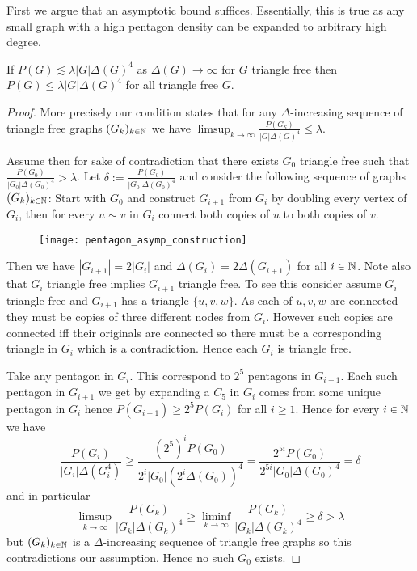 First we argue that an asymptotic bound suffices. Essentially, this is true as any small
graph with a high pentagon density can be expanded to arbitrary high degree.
\begin{lemma}
    \label{lemma:pentagon_asymp_suffices}
    If $P(G) \lesssim \lambda|G|\Delta(G)^4$ as $\Delta(G)\to\infty$ for
    $G$ triangle free
    then $P(G) \leq \lambda|G|\Delta(G)^4$ for all triangle free $G$.
\end{lemma}

\begin{proof}
    More precisely our condition states that for any $\Delta$-increasing sequence of
    triangle free graphs $(G_k)_{k\in\mathbb{N}}$ we have
    $\limsup_{k\to\infty} \frac{P(G_k)}{|G|\Delta(G)^4} \leq \lambda$.

    Assume then for sake of contradiction that there exists $G_0$ triangle free
    such that $\frac{P(G_0)}{|G_0|\Delta(G_0)^4} > \lambda$.
    Let $\delta := \frac{P(G_0)}{|G_0|\Delta(G_0)^4}$ and consider the following
    sequence of graphs $(G_k)_{k\in\mathbb{N}}$: Start with $G_0$ and construct
    $G_{i+1}$ from $G_i$ by doubling every vertex of $G_i$, then for every
    $u\sim v$ in $G_i$ connect both copies of $u$ to both copies of $v$.

    \begin{figure}[!ht]
        \centering
        \texttt{[image: pentagon\_asymp\_construction]}
    \end{figure}

    Then we have $|G_{i+1}| = 2|G_i|$ and $\Delta(G_i) = 2\Delta(G_{i+1})$ for all
    $i\in\mathbb{N}$. Note also that $G_i$ triangle free implies $G_{i+1}$ triangle free.
    To see this consider assume $G_i$ triangle free and $G_{i+1}$ has a triangle
    $\{u, v, w\}$. As each of $u,v,w$ are connected they must be copies of three
    different nodes from $G_i$. However such copies are connected iff their originals are
    connected so there must be a corresponding triangle in $G_i$ which is a contradiction.
    Hence each $G_i$ is triangle free.

    Take any pentagon in $G_i$. This correspond to $2^5$ pentagons in $G_{i+1}$. Each
    such pentagon in $G_{i+1}$ we get by expanding a $C_5$ in $G_i$ comes from
    some unique pentagon in $G_i$ hence $P(G_{i+1}) \geq 2^5P(G_i)$ for all $i\geq 1$.
    Hence for every $i\in\mathbb{N}$ we have
    \[
        \frac{P(G_i)}{|G_i|\Delta(G_i^4)} \geq
        \frac{(2^5)^i P(G_0)}{2^i|G_0|(2^i\Delta(G_0))^4}
        = \frac{2^{5i} P(G_0)}{2^{5i}|G_0|\Delta(G_0)^4}
        = \delta
    \]
    and in particular
    \[
        \limsup_{k\to\infty}\frac{P(G_k)}{|G_k|\Delta(G_k)^4} \geq
        \liminf_{k\to\infty}\frac{P(G_k)}{|G_k|\Delta(G_k)^4}
        \geq \delta > \lambda
    \]
    but $(G_k)_{k\in\mathbb{N}}$ is a $\Delta$-increasing sequence of triangle free graphs
    so this contradictions our assumption. Hence no such $G_0$ exists.
\end{proof}

